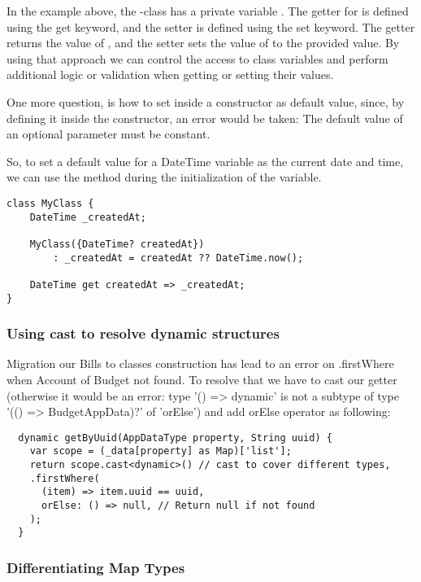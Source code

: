 In the example above, the -class has a private variable . The getter for  is defined 
using the get keyword, and the setter is defined using the set keyword. The getter returns the value of 
, and the setter sets the value of  to the provided value. By using that approach we can control 
the access to class variables and perform additional logic or validation when getting or setting their values.

One more question, is how to set  inside a constructor as default value, since, by defining it inside
the constructor, an error would be taken: The default value of an optional parameter must be constant.

So, to set a default value for a DateTime variable as the current date and time, we can use the  method 
during the initialization of the variable.

\begin{lstlisting}
class MyClass {
    DateTime _createdAt;

    MyClass({DateTime? createdAt})
        : _createdAt = createdAt ?? DateTime.now();

    DateTime get createdAt => _createdAt;
}
\end{lstlisting}


\subsubsection{Using cast to resolve dynamic structures}

Migration our Bills to classes construction has lead to an error on .firstWhere when Account of Budget not found. 
To resolve that we have to cast our getter (otherwise it would be an error: type '() => dynamic' is not a subtype 
of type '(() => BudgetAppData)?' of 'orElse') and add orElse operator as following:

\begin{lstlisting}
  dynamic getByUuid(AppDataType property, String uuid) {
    var scope = (_data[property] as Map)['list'];
    return scope.cast<dynamic>() // cast to cover different types, 
    .firstWhere(
      (item) => item.uuid == uuid,
      orElse: () => null, // Return null if not found
    );
  }
\end{lstlisting}


\subsubsection{Differentiating Map Types}

